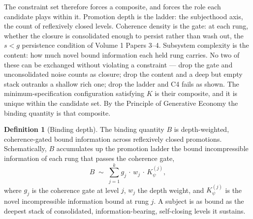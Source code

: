 \documentclass[11pt,oneside]{report}
\theoremstyle{definition}
\newtheorem{definition}[theorem]{Definition}
\theoremstyle{remark}
\begin{document}
The constraint set therefore forces a composite, and forces the role each
candidate plays within it. Promotion depth is the ladder: the subjecthood
axis, the count of reflexively closed levels. Coherence density is the
gate: at each rung, whether the closure is consolidated enough to persist
rather than wash out, the \ensuremath{s < g} persistence condition of
Volume 1 Papers 3--4. Subsystem complexity is the content: how much novel
bound information each held rung carries. No two of these can be exchanged
without violating a constraint --- drop the gate and unconsolidated noise
counts as closure; drop the content and a deep but empty stack outranks a
shallow rich one; drop the ladder and C4 fails as shown. The
minimum-specification configuration satisfying \ensuremath{K} is their
composite, and it is unique within the candidate set. By the Principle of
Generative Economy the binding quantity is that composite.

\begin{definition}[Binding depth]
The binding quantity \ensuremath{B} is depth-weighted, coherence-gated
bound information across reflexively closed promotions. Schematically,
\ensuremath{B} accumulates up the promotion ladder the bound incompressible
information of each rung that passes the coherence gate,
\[
B \;\sim\; \sum_{j=1}^{k} g_j \,\cdot\, w_j \,\cdot\, K_{\psi}^{(j)},
\]
where \ensuremath{g_j} is the coherence gate at level \ensuremath{j}, \ensuremath{w_j} the depth weight, and
\ensuremath{K_{\psi}^{(j)}} is the novel incompressible information bound at rung \ensuremath{j}. A
subject is as bound as the deepest stack of consolidated,
information-bearing, self-closing levels it sustains.
\end{definition}
\end{document}
